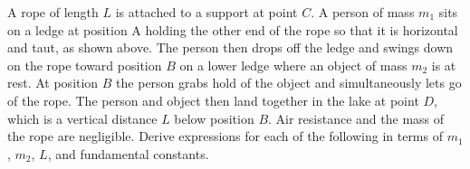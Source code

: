 \documentclass{../../oss-apphys-exam}
\begin{document}
\begin{questions}
  \question A rope of length $L$ is attached to a support at point $C$. A person
  of mass $m_1$ sits on a ledge at position A holding the other end of the rope
  so that it is horizontal and taut, as shown above. The person then drops off
  the ledge and swings down on the rope toward position $B$ on a lower ledge
  where an object of mass $m_2$ is at rest. At position $B$ the person grabs
  hold of the object and simultaneously lets go of the rope. The person and
  object then land together in the lake at point $D$, which is a vertical
  distance $L$ below position $B$. Air resistance and the mass of the rope are
  negligible. Derive expressions for each of the following in terms of
  $m_1$, $m_2$, $L$, and fundamental constants.
\end{questions}
\end{document}
